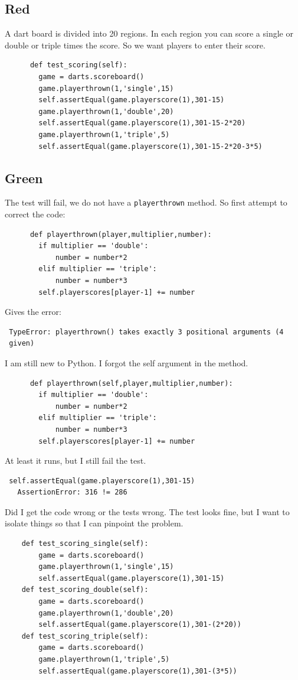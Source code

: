 \documentclass{paper}
\begin{document}
\subsection{Red}
A dart board is divided into 20 regions. In each region you can score
a single or double or triple times the score. So we want players to
enter their score.
\begin{lstlisting}
      def test_scoring(self):
        game = darts.scoreboard()
        game.playerthrown(1,'single',15)
        self.assertEqual(game.playerscore(1),301-15)
        game.playerthrown(1,'double',20)
        self.assertEqual(game.playerscore(1),301-15-2*20)
        game.playerthrown(1,'triple',5)
        self.assertEqual(game.playerscore(1),301-15-2*20-3*5)
\end{lstlisting}
\subsection{Green}
The test will fail, we do not have a {\tt playerthrown} method. So
first attempt to correct the code:
\begin{lstlisting}
      def playerthrown(player,multiplier,number):
        if multiplier == 'double':
            number = number*2
        elif multiplier == 'triple':
            number = number*3
        self.playerscores[player-1] += number
\end{lstlisting}
Gives the error:
\begin{verbatim}
 TypeError: playerthrown() takes exactly 3 positional arguments (4
 given)
\end{verbatim}
I am still new to Python. I forgot the self argument in the method.
\begin{lstlisting}
      def playerthrown(self,player,multiplier,number):
        if multiplier == 'double':
            number = number*2
        elif multiplier == 'triple':
            number = number*3
        self.playerscores[player-1] += number
\end{lstlisting}
At least it runs, but I still fail the test.
\begin{verbatim}
 self.assertEqual(game.playerscore(1),301-15)
   AssertionError: 316 != 286
\end{verbatim}
Did I get the code wrong or the tests wrong. The test looks fine, but
I want to isolate things so that I can pinpoint the problem.
\begin{lstlisting}
    def test_scoring_single(self):
        game = darts.scoreboard()
        game.playerthrown(1,'single',15)
        self.assertEqual(game.playerscore(1),301-15)
    def test_scoring_double(self):
        game = darts.scoreboard()
        game.playerthrown(1,'double',20)
        self.assertEqual(game.playerscore(1),301-(2*20))
    def test_scoring_triple(self):
        game = darts.scoreboard()
        game.playerthrown(1,'triple',5)
        self.assertEqual(game.playerscore(1),301-(3*5))
\end{lstlisting}
\end{document}

